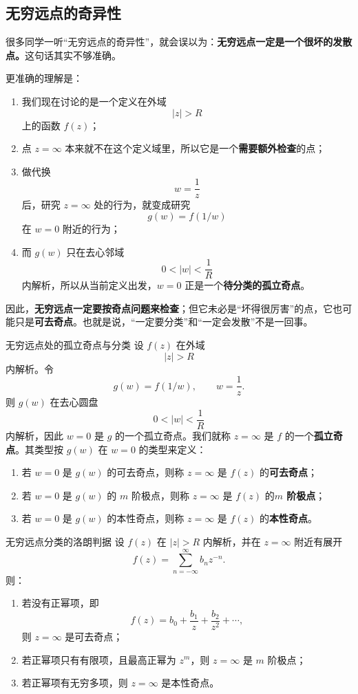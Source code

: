 \subsection{无穷远点的奇异性}

\begin{tishi}[先澄清一个最容易混淆的地方]
很多同学一听``无穷远点的奇异性''，就会误以为：\textbf{无穷远点一定是一个很坏的发散点。}这句话其实不够准确。

更准确的理解是：
\begin{enumerate}
    \item 我们现在讨论的是一个定义在外域
    \[
        |z|>R
    \]
    上的函数 $f(z)$；
    \item 点 $z=\infty$ 本来就不在这个定义域里，所以它是一个\textbf{需要额外检查}的点；
    \item 做代换
    \[
        w=\frac{1}{z}
    \]
    后，研究 $z=\infty$ 处的行为，就变成研究
    \[
        g(w)=f(1/w)
    \]
    在 $w=0$ 附近的行为；
    \item 而 $g(w)$ 只在去心邻域
    \[
        0<|w|<\frac{1}{R}
    \]
    内解析，所以从当前定义出发，$w=0$ 正是一个\textbf{待分类的孤立奇点}。
\end{enumerate}

因此，\textbf{无穷远点一定要按奇点问题来检查}；但它未必是``坏得很厉害''的点，它也可能只是\textbf{可去奇点}。也就是说，``一定要分类''和``一定会发散''不是一回事。
\end{tishi}

\begin{dingliyi}{无穷远点处的孤立奇点与分类}{}
设 $f(z)$ 在外域
\[
    |z|>R
\]
内解析。令
\[
    g(w)=f(1/w),\qquad w=\frac{1}{z}.
\]
则 $g(w)$ 在去心圆盘
\[
    0<|w|<\frac{1}{R}
\]
内解析，因此 $w=0$ 是 $g$ 的一个孤立奇点。我们就称 $z=\infty$ 是 $f$ 的一个\textbf{孤立奇点}。其类型按 $g(w)$ 在 $w=0$ 的类型来定义：
\begin{enumerate}
    \item 若 $w=0$ 是 $g(w)$ 的可去奇点，则称 $z=\infty$ 是 $f(z)$ 的\textbf{可去奇点}；
    \item 若 $w=0$ 是 $g(w)$ 的 $m$ 阶极点，则称 $z=\infty$ 是 $f(z)$ 的\textbf{$m$ 阶极点}；
    \item 若 $w=0$ 是 $g(w)$ 的本性奇点，则称 $z=\infty$ 是 $f(z)$ 的\textbf{本性奇点}。
\end{enumerate}
\end{dingliyi}

\begin{dingli}{无穷远点分类的洛朗判据}{}
设 $f(z)$ 在 $|z|>R$ 内解析，并在 $z=\infty$ 附近有展开
\[
    f(z)=\sum_{n=-\infty}^{\infty} b_n z^{-n}.
\]
则：
\begin{enumerate}
    \item 若没有正幂项，即
    \[
        f(z)=b_0+\frac{b_1}{z}+\frac{b_2}{z^2}+\cdots,
    \]
    则 $z=\infty$ 是可去奇点；
    \item 若正幂项只有有限项，且最高正幂为 $z^m$，则 $z=\infty$ 是 $m$ 阶极点；
    \item 若正幂项有无穷多项，则 $z=\infty$ 是本性奇点。
\end{enumerate}
\end{dingli}

